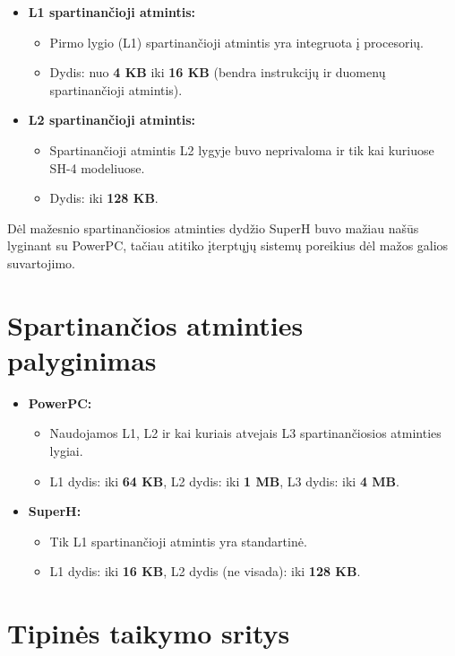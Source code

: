 \documentclass{article}
\begin{document}
\begin{itemize}
    \item \textbf{L1 spartinančioji atmintis:}
        \begin{itemize}
            \item Pirmo lygio (L1) spartinančioji atmintis yra integruota į procesorių.
            \item Dydis: nuo \textbf{4 KB} iki \textbf{16 KB} (bendra instrukcijų ir duomenų spartinančioji atmintis).
        \end{itemize}
    \item \textbf{L2 spartinančioji atmintis:}
        \begin{itemize}
            \item Spartinančioji atmintis L2 lygyje buvo neprivaloma ir tik kai kuriuose SH-4 modeliuose.
            \item Dydis: iki \textbf{128 KB}.
        \end{itemize}
\end{itemize}

Dėl mažesnio spartinančiosios atminties dydžio SuperH buvo mažiau našūs lyginant su PowerPC, tačiau atitiko įterptųjų sistemų poreikius dėl mažos galios suvartojimo.

\section*{Spartinančios atminties palyginimas}
\begin{itemize}
    \item \textbf{PowerPC:}
        \begin{itemize}
            \item Naudojamos L1, L2 ir kai kuriais atvejais L3 spartinančiosios atminties lygiai.
            \item L1 dydis: iki \textbf{64 KB}, L2 dydis: iki \textbf{1 MB}, L3 dydis: iki \textbf{4 MB}.
        \end{itemize}
    \item \textbf{SuperH:}
        \begin{itemize}
            \item Tik L1 spartinančioji atmintis yra standartinė.
            \item L1 dydis: iki \textbf{16 KB}, L2 dydis (ne visada): iki \textbf{128 KB}.
        \end{itemize}
\end{itemize}

\section{Tipinės taikymo sritys}
\end{document}
